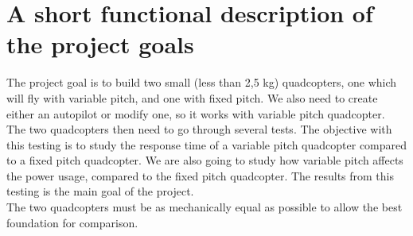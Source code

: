 \section{A short functional description of the project goals}

The project goal is to build two small (less than 2,5 kg) quadcopters, one which will fly with variable pitch, and one with fixed pitch. We also need to create either an autopilot or modify one, so it works with variable pitch quadcopter.
The two quadcopters then need to go through several tests. The objective with this testing is to study the response time of a variable pitch quadcopter compared to a fixed pitch quadcopter. We are also going to study how variable pitch affects the power usage, compared to the fixed pitch quadcopter. The results from this testing is the main goal of the project.  \\
The two quadcopters must be as mechanically equal as possible to allow the best foundation for comparison.